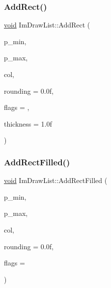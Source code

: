\mbox{\label{structImDrawList_ad96f10a3e954fe0c5b7c96d4e205af7b}} 
\subsubsection{\texorpdfstring{Add\+Rect()}{AddRect()}}
{\footnotesize\ttfamily \hyperlink{imgui__impl__opengl3__loader_8h_ac668e7cffd9e2e9cfee428b9b2f34fa7}{void} Im\+Draw\+List\+::\+Add\+Rect (\begin{DoxyParamCaption}\item[{const \hyperlink{structImVec2}{Im\+Vec2} \&}]{p\+\_\+min,  }\item[{const \hyperlink{structImVec2}{Im\+Vec2} \&}]{p\+\_\+max,  }\item[{Im\+U32}]{col,  }\item[{float}]{rounding = {\ttfamily 0.0f},  }\item[{Im\+Draw\+Flags}]{flags = {},  }\item[{float}]{thickness = {\ttfamily 1.0f} }\end{DoxyParamCaption})}

\mbox{\label{structImDrawList_a6b16ab764160b0251d2e7b3bd08c1ffc}} 
\subsubsection{\texorpdfstring{Add\+Rect\+Filled()}{AddRectFilled()}}
{\footnotesize\ttfamily \hyperlink{imgui__impl__opengl3__loader_8h_ac668e7cffd9e2e9cfee428b9b2f34fa7}{void} Im\+Draw\+List\+::\+Add\+Rect\+Filled (\begin{DoxyParamCaption}\item[{const \hyperlink{structImVec2}{Im\+Vec2} \&}]{p\+\_\+min,  }\item[{const \hyperlink{structImVec2}{Im\+Vec2} \&}]{p\+\_\+max,  }\item[{Im\+U32}]{col,  }\item[{float}]{rounding = {\ttfamily 0.0f},  }\item[{Im\+Draw\+Flags}]{flags = {} }\end{DoxyParamCaption})}

